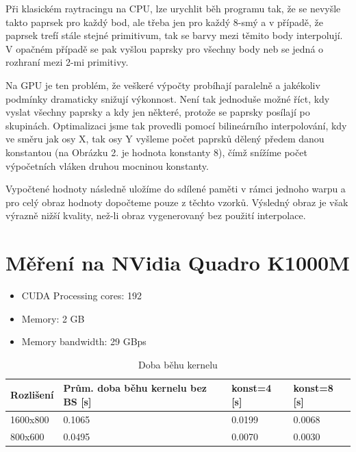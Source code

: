 \documentclass[12pt,a4paper,titlepage,final]{report}
\begin{document}
Při klasickém raytracingu na CPU, lze urychlit běh programu tak, že se nevyšle takto paprsek pro každý bod, ale třeba jen pro každý 8-smý a v případě, že paprsek trefí stále stejné primitivum, tak se barvy mezi těmito body interpolují. V opačném případě se pak vyšlou paprsky pro všechny body neb se jedná o rozhraní mezi 2-mi primitivy.
	
Na GPU je ten problém, že veškeré výpočty probíhají paralelně a jakékoliv podmínky dramaticky snižují výkonnost. Není tak jednoduše možné říct, kdy vyslat všechny paprsky a kdy jen některé, protože se paprsky posílají po skupinách. Optimalizaci jsme tak provedli pomocí bilineárního interpolování, kdy ve směru jak osy X, tak osy Y vyšleme počet paprsků dělený předem danou konstantou (na Obrázku 2. je hodnota konstanty 8), čímž snížíme počet výpočetních vláken druhou mocninou konstanty.
	
Vypočtené hodnoty následně uložíme do sdílené paměti v rámci jednoho warpu a pro celý obraz hodnoty dopočteme pouze z těchto vzorků. Výsledný obraz je však výrazně nižší kvality, než-li obraz vygenerovaný bez použití interpolace.

\section{Měření na NVidia Quadro K1000M}
\begin{itemize}
	\item CUDA Processing cores: 192
	\item Memory: 2 GB
	\item Memory bandwidth: 29 GBps 
\end{itemize}	
	
\begin{table}[h!]
	\begin{center}
    \begin{tabular}{ | p{3.5cm} | p{3.5cm} | p{3.5cm} | p{3.5cm} |}
    \hline
    Rozlišení & Prům. doba běhu kernelu bez BS [s]& konst=4 [s]& konst=8 [s]
    \\ \hline
    
	1600x800 & 0.1065 & 0.0199 & 0.0068
	\\ \hline
	
	800x600 & 0.0495 & 0.0070 & 0.0030
	\\ \hline
	
    \end{tabular}
	\end{center}	
	\caption{Doba běhu kernelu}  
\end{table}
\end{document}

